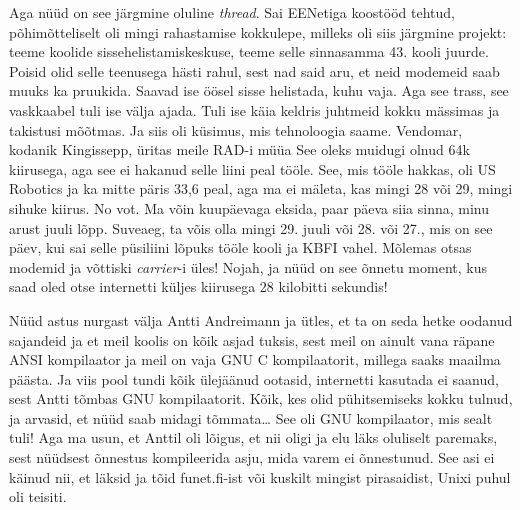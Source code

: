 Aga nüüd on see järgmine oluline \emph{thread}. Sai EENetiga koostööd tehtud, põhimõtteliselt oli mingi rahastamise kokkulepe, milleks oli siis järgmine projekt: teeme koolide sissehelistamiskeskuse, teeme selle sinnasamma 43. kooli juurde. Poisid olid selle teenusega hästi rahul, sest nad said aru, et neid modemeid saab muuks ka pruukida. Saavad ise öösel sisse helistada, kuhu vaja. Aga see trass, see vaskkaabel tuli ise välja ajada. Tuli ise käia keldris juhtmeid kokku mässimas ja takistusi mõõtmas. Ja siis oli küsimus, mis tehnoloogia saame. Vendomar, kodanik Kingissepp, üritas meile RAD-i müüa See oleks muidugi olnud 64k kiirusega, aga see ei hakanud selle liini peal tööle. See, mis tööle hakkas, oli US Robotics ja ka mitte päris 33,6 peal, aga ma ei mäleta, kas mingi 28 või 29, mingi sihuke kiirus. No vot. Ma võin kuupäevaga eksida, paar päeva siia sinna, minu arust juuli lõpp. Suveaeg, ta võis olla mingi 29. juuli või 28. või 27., mis on see päev, kui sai selle püsiliini  lõpuks tööle kooli ja KBFI vahel. Mõlemas otsas modemid ja võttiski \emph{carrier}-i üles! Nojah, ja nüüd on see õnnetu moment, kus saad oled otse internetti küljes kiirusega 28 kilobitti sekundis! 

Nüüd astus nurgast välja Antti Andreimann ja ütles, et ta on seda hetke oodanud sajandeid ja et meil koolis on kõik asjad tuksis, sest meil on ainult vana räpane ANSI kompilaator ja meil on vaja GNU C kompilaatorit, millega saaks maailma päästa. Ja viis pool tundi kõik ülejäänud ootasid, internetti kasutada ei saanud, sest Antti tõmbas GNU kompilaatorit. Kõik, kes olid pühitsemiseks kokku tulnud, ja arvasid, et nüüd saab midagi tõmmata\ldots {} See oli GNU kompilaator, mis sealt tuli! Aga ma usun, et Anttil oli lõigus, et  nii oligi ja elu läks oluliselt paremaks, sest nüüdsest õnnestus kompileerida asju, mida varem ei õnnestunud. See asi ei käinud nii, et läksid ja tõid funet.fi-ist või kuskilt mingist pirasaidist, Unixi puhul oli teisiti. 

